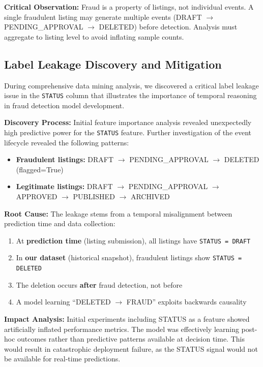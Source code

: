 \textbf{Critical Observation:} Fraud is a property of listings, not individual events. A single fraudulent listing may generate multiple events (DRAFT $\rightarrow$ PENDING\_APPROVAL $\rightarrow$ DELETED) before detection. Analysis must aggregate to listing level to avoid inflating sample counts.

\subsection{Label Leakage Discovery and Mitigation}

During comprehensive data mining analysis, we discovered a critical label leakage issue in the \texttt{STATUS} column that illustrates the importance of temporal reasoning in fraud detection model development.

\textbf{Discovery Process:} Initial feature importance analysis revealed unexpectedly high predictive power for the \texttt{STATUS} feature. Further investigation of the event lifecycle revealed the following patterns:

\begin{itemize}
    \item \textbf{Fraudulent listings:} DRAFT $\rightarrow$ PENDING\_APPROVAL $\rightarrow$ DELETED (flagged=True)
    \item \textbf{Legitimate listings:} DRAFT $\rightarrow$ PENDING\_APPROVAL $\rightarrow$ APPROVED $\rightarrow$ PUBLISHED $\rightarrow$ ARCHIVED
\end{itemize}

\textbf{Root Cause:} The leakage stems from a temporal misalignment between prediction time and data collection:
\begin{enumerate}
    \item At \textbf{prediction time} (listing submission), all listings have \texttt{STATUS = DRAFT}
    \item In \textbf{our dataset} (historical snapshot), fraudulent listings show \texttt{STATUS = DELETED}
    \item The deletion occurs \textbf{after} fraud detection, not before
    \item A model learning ``DELETED $\rightarrow$ FRAUD'' exploits backwards causality
\end{enumerate}

\textbf{Impact Analysis:} Initial experiments including STATUS as a feature showed artificially inflated performance metrics. The model was effectively learning post-hoc outcomes rather than predictive patterns available at decision time. This would result in catastrophic deployment failure, as the STATUS signal would not be available for real-time predictions.

